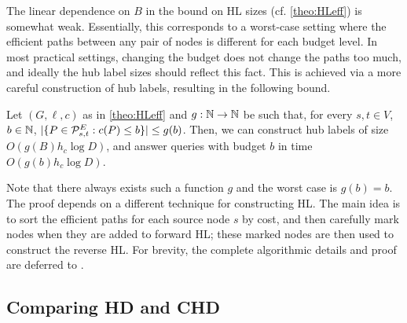 The linear dependence on $B$ in the bound on HL sizes (cf. \cref{theo:HLeff}) is somewhat weak. 
Essentially, this corresponds to a worst-case setting where the efficient paths between any pair of nodes is different for each budget level. 
In most practical settings, changing the budget does not change the paths too much, and ideally the hub label sizes should reflect this fact. 
This is achieved via a more careful construction of hub labels, resulting in the following bound. 
\begin{theorem}\label{thm:markedhubs}
	Let $(G,\ell,c)$ as in \cref{theo:HLeff} and $g:\mathbb{N}\to \mathbb{N}$ be such that, for every $s,t\in V$, $b\in \mathbb{N}$, $\lvert\{P\in\mathcal{P}_{s,t}^E: c(P)\leq b\}\rvert \leq g(b)$.
	Then, we can construct hub labels of size $O(g(B)h_c\log D)$, and answer queries with budget $b$ in time $O(g(b)h_c\log D)$.
\end{theorem}

Note that there always exists such a function $g$ and the worst case is $g(b)=b$.
The proof depends on a different technique for constructing HL.
The main idea is to sort the efficient paths for each source node $s$ by cost, and then carefully mark nodes when they are added to forward HL; these marked nodes are then used to construct the reverse HL.
For brevity, the complete algorithmic details and proof are deferred to \cite{TechReport}.

\subsection{Comparing HD and CHD}
\label{ssec:hdvschd}

